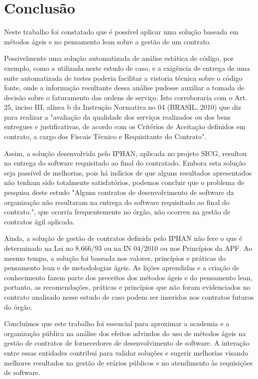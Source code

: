 \section{Conclusão}
\label{sec:conclusao}


Neste trabalho foi constatado que é possível aplicar uma solução baseada em métodos ágeis e no pensamento lean sobre a gestão de um contrato.

Possivelmente uma solução automatizada de análise estática de código, por exemplo, como a utilizada neste estudo de caso, e a exigência de entrega de uma suíte automatizada de testes poderia facilitar a vistoria técnica sobre o
 código fonte, onde a informação resultante dessa análise pudesse auxiliar a tomada de
 decisão sobre o faturamento das ordens de serviço. Isto corroboraria com o Art. 25, inciso III, alínea b da Instrução Normativa no 04 (BRASIL, 2010) que diz para realizar a
 "avaliação da qualidade dos serviços realizados ou dos bens entregues e justificativas, de
 acordo com os Critérios de Aceitação definidos em contrato, a cargo dos Fiscais Técnico
 e Requisitante do Contrato".

Assim, a solução desenvolvida pelo IPHAN, aplicada no projeto SICG, resultou na
 entrega do software requisitado ao final do contratado. Embora esta solução seja passível
 de melhorias, pois há indícios de que alguns resultados apresentados não tenham sido
 totalmente satisfatórios, podemos concluir que o problema de pesquisa deste estudo "Alguns contratos de desenvolvimento de software da organização não resultaram na entrega
 do software requisitado ao final do contrato.", que ocorria frequentemente no órgão, não
 ocorreu na gestão de contratos ágil aplicada.

Ainda, a solução de gestão de contratos definida pelo
 IPHAN não fere o que é determinado na Lei no 8.666/93 ou na IN 04/2010 ou nos Princípios da APF. Ao mesmo tempo, a solução foi baseada nos valores, princípios e práticas
 do pensamento lean e de metodologias ágeis. As lições aprendidas e a criação de conhecimento fazem parte dos preceitos dos métodos ágeis e do pensamento lean, portanto, as
 recomendações, práticas e princípios que não foram evidenciados no contrato analisado
 nesse estudo de caso podem ser inseridos nos contratos futuros do órgão.


Concluímos que este trabalho foi essencial para aproximar a academia e a organização pública na análise dos efeitos advindos do uso de métodos ágeis na gestão de contratos de fornecedores de desenvolvimento de software. A interação entre
essas entidades contribui para validar soluções e sugerir melhorias visando melhores resultados na gestão de erários públicos e no atendimento às requisições de software.
